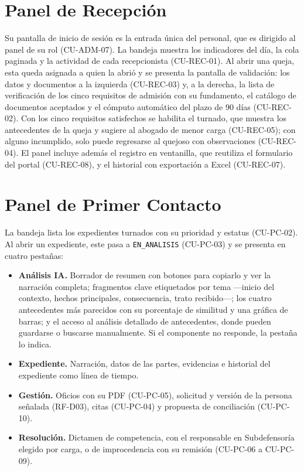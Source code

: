 	\section{Panel de Recepción}
	\label{sec:modulo_revision}
	Su pantalla de inicio de sesión es la entrada única del personal, que es dirigido al panel de su rol
	(CU-ADM-07). La bandeja muestra los indicadores del día, la cola paginada y la actividad de cada
	recepcionista (CU-REC-01). Al abrir una queja, esta queda asignada a quien la abrió y se presenta la
	pantalla de validación: los datos y documentos a la izquierda (CU-REC-03) y, a la derecha, la lista
	de verificación de los cinco requisitos de admisión con su fundamento, el catálogo de documentos
	aceptados y el cómputo automático del plazo de 90 días (CU-REC-02). Con los cinco requisitos
	satisfechos se habilita el turnado, que muestra los antecedentes de la queja y sugiere al abogado de
	menor carga (CU-REC-05); con alguno incumplido, solo puede regresarse al quejoso con observaciones
	(CU-REC-04). El panel incluye además el registro en ventanilla, que reutiliza el formulario del
	portal (CU-REC-08), y el historial con exportación a Excel (CU-REC-07).

	\section{Panel de Primer Contacto}
	\label{sec:modulo_primer_contacto}
	La bandeja lista los expedientes turnados con su prioridad y estatus (CU-PC-02). Al abrir un
	expediente, este pasa a \texttt{EN\_ANALISIS} (CU-PC-03) y se presenta en cuatro pestañas:

	\begin{itemize}
		\item \textbf{Análisis IA.} Borrador de resumen con botones para copiarlo y ver la narración
		completa; fragmentos clave etiquetados por tema ---inicio del contexto, hechos principales,
		consecuencia, trato recibido---; los cuatro antecedentes más parecidos con su porcentaje de
		similitud y una gráfica de barras; y el acceso al análisis detallado de antecedentes, donde pueden
		guardarse o buscarse manualmente. Si el componente no responde, la pestaña lo indica.
		\item \textbf{Expediente.} Narración, datos de las partes, evidencias e historial del expediente
		como línea de tiempo.
		\item \textbf{Gestión.} Oficios con su PDF (CU-PC-05), solicitud y versión de la persona señalada
		(RF-D03), citas (CU-PC-04) y propuesta de conciliación (CU-PC-10).
		\item \textbf{Resolución.} Dictamen de competencia, con el responsable en Subdefensoría elegido
		por carga, o de improcedencia con su remisión (CU-PC-06 a CU-PC-09).
	\end{itemize}

